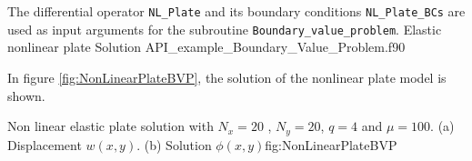         
     
The differential operator \verb|NL_Plate| and its boundary conditions \verb|NL_Plate_BCs| are used as input arguments for the subroutine 
\verb|Boundary_value_problem|.       
          \vspace{0.5cm} 
          {Elastic nonlinear plate}
          {Solution}
          {API_example_Boundary_Value_Problem.f90}
          
        
In figure \ref{fig:NonLinearPlateBVP}, the solution of the nonlinear plate model is shown. 
          
             
          
          \twographs
          {}
          {}
          {Non linear elastic plate solution with $ N_x = 20 $ , $ N_y = 20 $, $q=4$ and $\mu=100$. (a) Displacement $w(x,y)$.
          (b) Solution $\phi(x,y)$}{fig:NonLinearPlateBVP}






